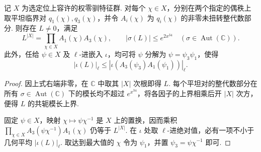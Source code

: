 \begin{lemma}[两个平坦块的公共几何平均]
\label{lem:c-test-geometric-mean}
\emitthmsource
记 $X$ 为选定位上容许的权零驯特征群. 对每个 $\chi\in X$，分别在两个指定的偶秩上取平坦临界对 $q_1(\chi),q_3(\chi)$，并令 $A_i(\chi)$ 为 $q_i(\chi)$ 的非零未扭转整代数部分. 则存在 $L\ne0$，满足
\[
 L^{|X|}=\prod_{\chi\in X} A_1(\chi)A_3(\chi),
 \qquad |\sigma(L)|\le e^{2x^{34}}\quad(\sigma\in\operatorname{Aut}(\mathbb C)).
\]
此外，任给 $\psi\in X$ 及 $\ell$-进嵌入 $\iota$，均可将 $\psi$ 分解为 $\psi=\psi_3\psi_1$，使得
\[
 |\iota(L)|_\ell\le|\iota(A_3(\psi_3)A_1(\psi_1))|_\ell.
\]
\end{lemma}
\begin{proof}
因上式右端非零，在 $\mathbb C$ 中取其 $|X|$ 次根即得 $L$. 每个平坦对的整代数部分在所有 $\sigma\in\operatorname{Aut}(\mathbb C)$ 下的模长均不超过 $e^{x^{34}}$，将各因子的上界相乘后开 $|X|$ 次方，便得 $L$ 的共轭模长上界.

固定 $\psi\in X$，映射 $\chi\mapsto\psi\chi^{-1}$ 是 $X$ 上的置换，因而乘积 $\prod_{\chi\in X}A_3(\psi\chi^{-1})A_1(\chi)$ 仍等于 $L^{|X|}$. 在 $\iota$ 处取 $\ell$-进绝对值，必有一项不小于几何平均 $|\iota(L)|_\ell$. 取达到最大值的 $\chi$ 令为 $\psi_1$，并置 $\psi_3=\psi\chi^{-1}$ 即可.
\end{proof}

